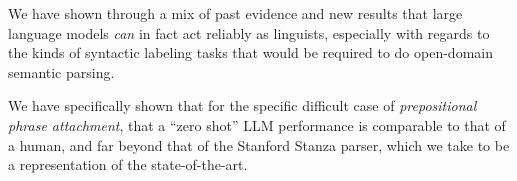 \label{sec:conclusion}
We have shown through a mix of past evidence and new results that large language models {\em can} in fact act reliably as linguists, especially with regards to the kinds of syntactic labeling tasks that would be required to do open-domain semantic parsing.

We have specifically shown that for the specific difficult case of {\em prepositional phrase attachment}, that a ``zero shot'' LLM performance is comparable to that of a human, and far beyond that of the Stanford Stanza parser, which we take to be a representation of the state-of-the-art.

